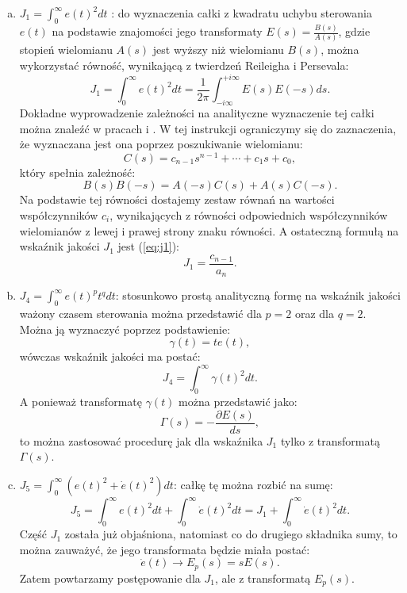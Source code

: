 \documentclass{article}
\begin{document}
    \begin{enumerate}[(a)]
        \item $J_{1} = \int_{0}^{\infty}{e(t)^{2}dt}$ : do wyznaczenia całki z kwadratu uchybu sterowania $e(t)$ na podstawie znajomości jego transformaty $E(s) = \frac{B(s)}{A(s)}$, gdzie stopień wielomianu $A(s)$ jest wyższy niż wielomianu $B(s)$, można wykorzystać równość, wynikającą z twierdzeń Reileigha i Persevala:
        $$
            J_{1}
            =
            \int_{0}^{\infty}{e(t)^{2}dt}
            =
            \frac{1}{2\pi}\int_{-i\infty}^{+i\infty}{E(s)E(-s)ds}.
        $$
        Dokładne wyprowadzenie zależności na analityczne wyznaczenie tej całki można znaleźć w pracach \cite{Mitkowski2007} i \cite{Gorecki1993}.
        W tej instrukcji ograniczymy się do zaznaczenia, że wyznaczana jest ona poprzez poszukiwanie wielomianu:
        $$
            C(s) = c_{n-1}s^{n-1} + \cdots + c_{1}s + c_{0},
        $$
        który spełnia zależność:
        $$
            B(s)B(-s) = A(-s)C(s) + A(s)C(-s).
        $$
        Na podstawie tej równości dostajemy zestaw równań na wartości współczynników $c_i$, wynikających z równości odpowiednich współczynników wielomianów z lewej i prawej strony znaku równości.
        A ostateczną formułą na wskaźnik jakości $J_{1}$ jest (\ref{eq:j1}):
        \begin{equation}
            J_{1} = \frac{c_{n-1}}{a_{n}}.
        \end{equation}

        \item $J_{4} = \int_{0}^{\infty}{e(t)^{p}t^{q}dt}$: stosunkowo prostą analityczną formę na wskaźnik jakości ważony czasem sterowania można przedstawić dla $p =2$ oraz dla $q = 2$.
        Można ją wyznaczyć poprzez podstawienie:
        $$
            \gamma(t) = te(t),
        $$
        wówczas wskaźnik jakości ma postać:
        $$
            J_{4} = \int_{0}^{\infty}{\gamma(t)^{2}dt}.
        $$
        A ponieważ transformatę $\gamma(t)$ można przedstawić jako:
        $$
            \Gamma(s) = -\frac{\partial E(s)}{ds},
        $$
        to można zastosować procedurę jak dla wskaźnika $J_{1}$ tylko z transformatą $\Gamma(s)$.

        \item $J_{5} = \int_{0}^{\infty}{\left(e(t)^{2} + \dot{e}(t)^{2}\right)dt}$: całkę tę można rozbić na sumę:
        $$
            J_{5} = \int_{0}^{\infty}{e(t)^{2}dt}  + \int_{0}^{\infty}{\dot{e}(t)^{2}dt} = J_{1} + \int_{0}^{\infty}{\dot{e}(t)^{2}dt}.
        $$
        Część $J_{1}$ została już objaśniona, natomiast co do drugiego składnika sumy, to można zauważyć, że jego transformata będzie miała postać:
        $$
            \dot{e}(t) \rightarrow E_{p}(s) = sE(s).
        $$
        Zatem powtarzamy postępowanie dla $J_{1}$, ale z transformatą
        $E_{p}(s)$.
        

\end{enumerate}
\end{document}
